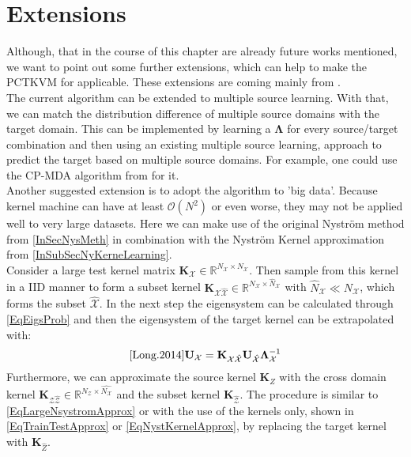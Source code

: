 \section{Extensions}\label{InSubSecFExt}
Although, that in the course of this chapter are already future works mentioned, we want to point out some further extensions, which can help to make the \acs{PCTKVM} for applicable.
These extensions are coming mainly from \cite{Long.2015}.\\
The current algorithm can be extended to multiple source learning.
With that, we can match the distribution difference of multiple source domains with the target domain.
This can be implemented by learning a $\mathbf{\Lambda}$ for every source/target combination and then using an existing multiple source learning, approach to predict the target based on multiple source domains.
For example, one could use the \ac{CP-MDA} algorithm from \cite{Chattopadhyay.2012} for it.\\
Another suggested extension is to adopt the algorithm to 'big data'.
Because kernel machine can have at least $\mathcal{O}(N^2)$ or even worse, they may not be applied well to very large datasets.
Here we can make use of the original Nyström method from \ref{InSecNysMeth} in combination with the Nyström Kernel approximation from \ref{InSubSecNyKerneLearning}.\cite{Long.2015}\\
Consider a large test kernel matrix $\mathbf{K}_\mathcal{X} \in \mathbb{R}^{N_\mathcal{X}\times N_\mathcal{X}}$.
Then sample from this kernel in a \acs{IID} manner to form a subset kernel $\mathbf{K}_\mathcal{X\hat{X}} \in \mathbb{R}^{N_\mathcal{X}\times \hat{N}_\mathcal{X}}$ with $\hat{N}_\mathcal{X} \ll N_\mathcal{X}$, which forms the subset $\mathcal{\hat{X}}$.
In the next step the eigensystem can be calculated through \eqref{EqEigsProb} and then the eigensystem of the target kernel can be extrapolated with:
\begin{equation}\label{EqLargeNsystromApprox}\cite{Long.2014}
\mathbf{U}_\mathcal{X}=\mathbf{K}_\mathcal{X\hat{X}}\mathbf{U}_\mathcal{\hat{X}}\mathbf{\Lambda}_\mathcal{X}^{-1}
\end{equation}
Furthermore, we can approximate the source kernel $\mathbf{K}_{Z}$ with the  cross domain kernel $\mathbf{K}_{\mathcal{Z\hat{Z}}} \in \mathbb{R}^{N_\mathcal{Z}\times \hat{N_\mathcal{X}}}$ and the subset kernel $\mathbf{K}_\mathcal{\hat{Z}}$.
The procedure is similar to \eqref{EqLargeNsystromApprox} or with the use of the kernels only, shown in \eqref{EqTrainTestApprox} or \eqref{EqNystKernelApprox}, by replacing the target kernel with $\mathbf{K}_{\hat{Z}}$.
